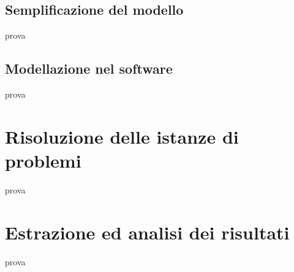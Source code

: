 \subsection{Semplificazione del modello}
prova

\subsection{Modellazione nel software}
prova





\section{Risoluzione delle istanze di problemi}
prova





\section{Estrazione ed analisi dei risultati}
prova